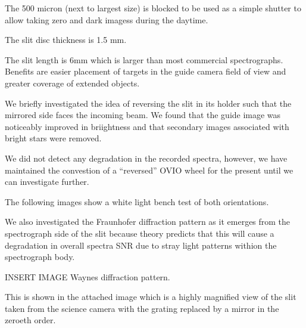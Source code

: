 \documentclass[letterpaper,10pt,english,openany,oneside]{sphinxmanual}
\begin{document}
\sphinxAtStartPar
The 500 micron (next to largest size) is blocked to be used as a
simple shutter to allow taking zero and dark imagess during the
daytime.

\sphinxAtStartPar
The slit disc thickness is 1.5 mm.

\sphinxAtStartPar
The slit length is 6mm which is larger than most commercial
spectrographs. Benefits are easier placement of targets in the
guide camera field of view and greater coverage of extended
objects.

\sphinxAtStartPar
We briefly investigated the idea of reversing the slit in its
holder such that the mirrored side faces the incoming beam.
We found that the guide image was noticeably improved in
briightness and that secondary images associated with bright
stars were removed.

\sphinxAtStartPar
We did not detect any degradation in the recorded spectra,
however, we have maintained the convestion of a “reversed” OVIO
wheel for the present until we can investigate further.

\sphinxAtStartPar
The following images show a white light bench test of both
orientations.

\begin{figure}[htbp]
\centering

\noindent{}
\end{figure}

\begin{figure}[htbp]
\centering

\noindent{}
\end{figure}

\sphinxAtStartPar
We also investigated the Fraunhofer diffraction pattern as it
emerges from the spectrograph side of the slit because theory
predicts that this will cause a degradation in overall spectra
SNR due to stray light patterns withion the spectrograph body.

\sphinxAtStartPar
INSERT IMAGE \sphinxhyphen{} Waynes diffraction pattern.

\sphinxAtStartPar
This is shown in the attached image which is a highly
magnified view of the slit taken from the science camera
with the grating replaced by a mirror in the zeroeth order.

\begin{figure}[htbp]
\centering

\noindent{}
\end{figure}
\end{document}
